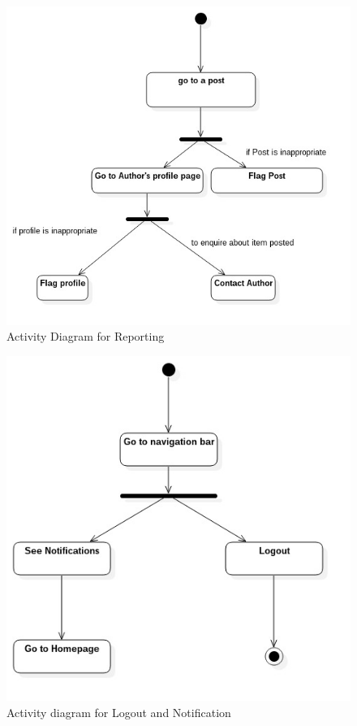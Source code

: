 \documentclass[a4paper,12pt]{article}
\begin{document}
{\begin{figure}[h!]
  \includegraphics[width=1\textwidth]{activity6}
  \caption{Activity Diagram for Reporting}
\end{figure}
\begin{figure}[h!]
  \includegraphics[width=1\textwidth]{activity7}
  \caption{Activity diagram for Logout and Notification}
\end{figure}
}
\end{document}
